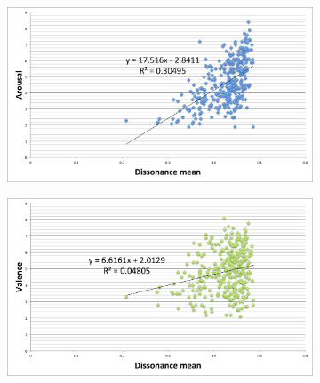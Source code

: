 \begin{figure}
         \centering
        \begin{subfigure}[b]{0.48\textwidth}
                \includegraphics[width=\textwidth]{Figures/dissonancemean-arousal}
			   \vspace{20pt}
        \end{subfigure}
        \begin{subfigure}[b]{0.48\textwidth}
                \includegraphics[width=\textwidth]{Figures/dissonancemean-valence}
                  \vspace{20pt}
        \end{subfigure}
        

\end{figure}
